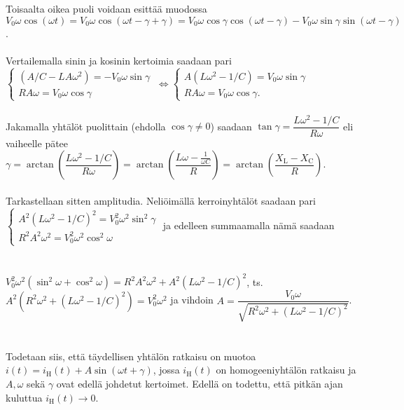 \documentclass[12pt,fleqn]{article}
\begin{document}
\begin{enumerate}[label=\textbf{\arabic*.}]
Toisaalta oikea puoli voidaan esittää muodossa\\ \(V_0 \omega \cos(\omega t)=V_0 \omega \cos(\omega t-\gamma +\gamma)=V_0 \omega \cos \gamma \cos(\omega t-\gamma) - V_0 \omega \sin \gamma \sin (\omega t-\gamma)\).\\
 \\
Vertailemalla sinin ja kosinin kertoimia saadaan pari \\ \(\begin{cases} (A/C-LA\omega ^2)=-V_0 \omega \sin \gamma\ \\ RA\omega =V_0\omega \cos \gamma \end{cases}  \iff \begin{cases} A(L\omega ^2-1/C)=V_0 \omega \sin \gamma \\ RA\omega =V_0\omega \cos \gamma .\end{cases}\)\\
 \\
Jakamalla yhtälöt puolittain (ehdolla \(\cos \gamma \neq 0\)) saadaan \(\tan \gamma =\dfrac{L\omega ^2-1/C}{R\omega}\) eli vaiheelle pätee \(\gamma = \arctan \left (\dfrac{L\omega ^2-1/C}{R\omega}\right )=\arctan \left (\dfrac{L\omega-\frac{1}{\omega C}}{R} \right )=\arctan \left (\dfrac{X_\text{L}-X_\text{C}}{R}\right )\).\\
 \\
Tarkastellaan sitten amplitudia. Neliöimällä kerroinyhtälöt saadaan pari \\ \(\begin{cases} A^2 (L\omega ^2-1/C)^2=V_0^2 \omega ^2 \sin^2 \gamma \\ R^2 A^2 \omega ^2=V_0^2 \omega ^2\cos^2 \omega \end{cases}\) ja edelleen summaamalla nämä saadaan \\ \\ \\ \(V_0^2\omega ^2 (\sin^2 \omega +\cos^2\omega)=R^2 A^2 \omega^2+A^2 (L\omega ^2-1/C)^2\), ts. \(A^2 (R^2 \omega ^2+(L\omega ^2-1/C)^2)=V_0^2 \omega^2\) ja vihdoin \(A=\dfrac{V_0 \omega}{\sqrt{R^2 \omega ^2+(L\omega ^2-1/C)^2}}\).
 \\
  \\
  \\
Todetaan siis, että täydellisen yhtälön ratkaisu on muotoa \(i(t)=i_\text{H}(t)+A\sin (\omega t+\gamma)\), jossa \(i_\text{H}(t)\) on homogeeniyhtälön ratkaisu ja \(A, \omega\) sekä \(\gamma\) ovat edellä johdetut kertoimet. Edellä on todettu, että pitkän ajan kuluttua \(i_\text{H}(t)\to 0\).\\

\end{enumerate}
\end{document}
